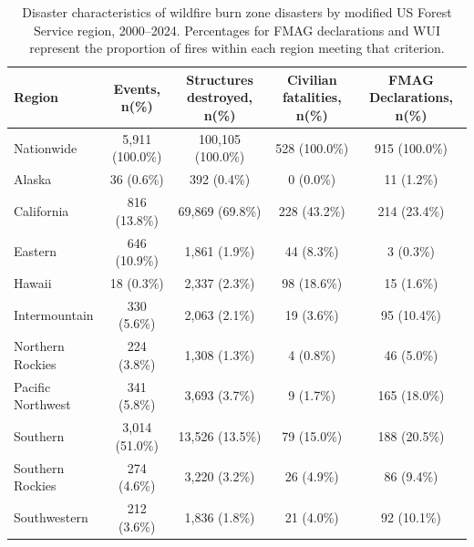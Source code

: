 \begin{table}[H]
\fontsize{6.0pt}{7.2pt}\selectfont
\begin{tabular*}{\linewidth}{@{\extracolsep{\fill}}lcccc}
\toprule
Region & Events, n(\%) & Structures destroyed, n(\%) & Civilian fatalities, n(\%) & FMAG Declarations, n(\%) \\ 
\midrule\addlinespace[2.5pt]
Nationwide & 5,911 (100.0\%) & 100,105 (100.0\%) & 528 (100.0\%) & 915 (100.0\%) \\ 
Alaska & 36 (0.6\%) & 392 (0.4\%) & 0 (0.0\%) & 11 (1.2\%) \\ 
California & 816 (13.8\%) & 69,869 (69.8\%) & 228 (43.2\%) & 214 (23.4\%) \\ 
Eastern & 646 (10.9\%) & 1,861 (1.9\%) & 44 (8.3\%) & 3 (0.3\%) \\ 
Hawaii & 18 (0.3\%) & 2,337 (2.3\%) & 98 (18.6\%) & 15 (1.6\%) \\ 
Intermountain & 330 (5.6\%) & 2,063 (2.1\%) & 19 (3.6\%) & 95 (10.4\%) \\ 
Northern Rockies & 224 (3.8\%) & 1,308 (1.3\%) & 4 (0.8\%) & 46 (5.0\%) \\ 
Pacific Northwest & 341 (5.8\%) & 3,693 (3.7\%) & 9 (1.7\%) & 165 (18.0\%) \\ 
Southern & 3,014 (51.0\%) & 13,526 (13.5\%) & 79 (15.0\%) & 188 (20.5\%) \\ 
Southern Rockies & 274 (4.6\%) & 3,220 (3.2\%) & 26 (4.9\%) & 86 (9.4\%) \\ 
Southwestern & 212 (3.6\%) & 1,836 (1.8\%) & 21 (4.0\%) & 92 (10.1\%) \\ 
\bottomrule
\end{tabular*}
\caption{Disaster characteristics of wildfire burn zone disasters by modified US Forest Service region, 2000--2024. Percentages for FMAG declarations and WUI represent the proportion of fires within each region meeting that criterion.}
\label{tab:population_exposure}
\end{table}

